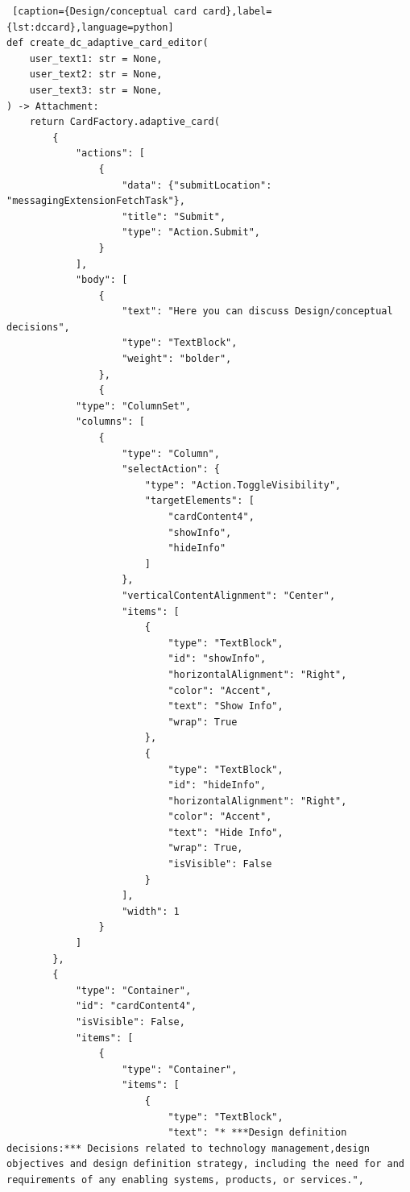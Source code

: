 \begin{lstlisting} [caption={Design/conceptual card card},label={lst:dccard},language=python]
def create_dc_adaptive_card_editor(
    user_text1: str = None,
    user_text2: str = None,
    user_text3: str = None,
) -> Attachment:
    return CardFactory.adaptive_card(
        {
            "actions": [
                {
                    "data": {"submitLocation": "messagingExtensionFetchTask"},
                    "title": "Submit",
                    "type": "Action.Submit",
                }
            ],
            "body": [
                {
                    "text": "Here you can discuss Design/conceptual decisions",
                    "type": "TextBlock",
                    "weight": "bolder",
                },
                {
            "type": "ColumnSet",
            "columns": [
                {
                    "type": "Column",
                    "selectAction": {
                        "type": "Action.ToggleVisibility",
                        "targetElements": [
                            "cardContent4",
                            "showInfo",
                            "hideInfo"
                        ]
                    },
                    "verticalContentAlignment": "Center",
                    "items": [
                        {
                            "type": "TextBlock",
                            "id": "showInfo",
                            "horizontalAlignment": "Right",
                            "color": "Accent",
                            "text": "Show Info",
                            "wrap": True
                        },
                        {
                            "type": "TextBlock",
                            "id": "hideInfo",
                            "horizontalAlignment": "Right",
                            "color": "Accent",
                            "text": "Hide Info",
                            "wrap": True,
                            "isVisible": False
                        }
                    ],
                    "width": 1
                }
            ]
        },
        {
            "type": "Container",
            "id": "cardContent4",
            "isVisible": False,
            "items": [
                {
                    "type": "Container",
                    "items": [
                        {
                            "type": "TextBlock",
                            "text": "* ***Design definition decisions:*** Decisions related to technology management,design objectives and design definition strategy, including the need for and requirements of any enabling systems, products, or services.",

\end{lstlisting}
